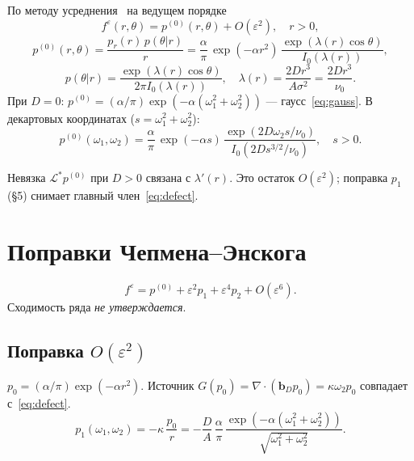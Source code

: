 \documentclass[12pt,a4paper]{article}
\newcommand{\nuz}{\nu_0}
\begin{document}
По методу усреднения~\cite{Khasminskii2012,FreidlinWentzell} на ведущем порядке
\begin{equation}\label{eq:leading}
  f^\varepsilon(r,\theta)=p^{(0)}(r,\theta)+O(\varepsilon^2),\quad r>0,
\end{equation}
\begin{equation}\label{eq:p0}
  p^{(0)}(r,\theta)=\frac{p_r(r)\,p(\theta|r)}{r}
  =\frac{\alpha}{\pi}\,\exp(-\alpha r^2)\,
  \frac{\exp(\lambda(r)\cos\theta)}{I_0(\lambda(r))},
\end{equation}
\begin{equation}\label{eq:vonmises}
  p(\theta|r)=\frac{\exp(\lambda(r)\cos\theta)}{2\pi I_0(\lambda(r))},\quad
  \lambda(r)=\frac{2Dr^3}{A\sigma^2}=\frac{2Dr^3}{\nuz}.
\end{equation}
При $D=0$: $p^{(0)}=(\alpha/\pi)\exp(-\alpha(\omega_1^2+\omega_2^2))$ --- гаусс~\eqref{eq:gauss}.
В декартовых координатах ($s=\omega_1^2+\omega_2^2$):
\begin{equation}\label{eq:p0cart}
  p^{(0)}(\omega_1,\omega_2)=\frac{\alpha}{\pi}\,
  \exp(-\alpha s)\,
  \frac{\exp(2D\omega_2 s/\nuz)}{I_0(2Ds^{3/2}/\nuz)},\quad s>0.
\end{equation}

\begin{remark}\label{rem:defect}
Невязка $\mathcal{L}^*p^{(0)}$ при $D>0$ связана с $\lambda'(r)$. Это остаток $O(\varepsilon^2)$;
поправка $p_1$ (§5) снимает главный член~\eqref{eq:defect}.
\end{remark}

\section{Поправки Чепмена--Энскога}

\begin{equation}\label{eq:ce-expansion}
  f^\varepsilon=p^{(0)}+\varepsilon^2 p_1+\varepsilon^4 p_2+O(\varepsilon^6).
\end{equation}
Сходимость ряда \emph{не утверждается}.

\subsection{Поправка $O(\varepsilon^2)$}

$p_0=(\alpha/\pi)\exp(-\alpha r^2)$. Источник $G(p_0)=\nabla\cdot(\bm b_D p_0)=\kappa\omega_2 p_0$ совпадает с~\eqref{eq:defect}.
\begin{equation}\label{eq:p1}
  p_1(\omega_1,\omega_2)=-\kappa\,\frac{p_0}{r}
  =-\frac{D}{A}\,\frac{\alpha}{\pi}\,
  \frac{\exp(-\alpha(\omega_1^2+\omega_2^2))}{\sqrt{\omega_1^2+\omega_2^2}}.
\end{equation}
\end{document}
